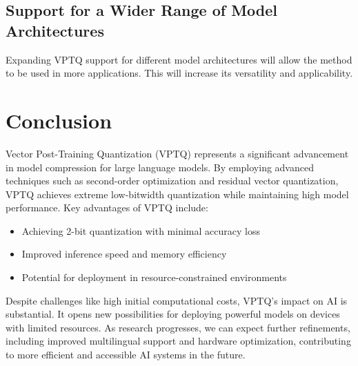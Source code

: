 \documentclass{article}
\begin{document}
\subsection{Support for a Wider Range of Model Architectures}
Expanding VPTQ support for different model architectures will allow the method to be used in more applications. This will increase its versatility and applicability.

\section{Conclusion}
Vector Post-Training Quantization (VPTQ) represents a significant advancement in model compression for large language models. By employing advanced techniques such as second-order optimization and residual vector quantization, VPTQ achieves extreme low-bitwidth quantization while maintaining high model performance.
Key advantages of VPTQ include:
\begin{itemize}
\item Achieving 2-bit quantization with minimal accuracy loss
\item Improved inference speed and memory efficiency
\item Potential for deployment in resource-constrained environments
\end{itemize}
Despite challenges like high initial computational costs, VPTQ's impact on AI is substantial. It opens new possibilities for deploying powerful models on devices with limited resources. As research progresses, we can expect further refinements, including improved multilingual support and hardware optimization, contributing to more efficient and accessible AI systems in the future.
\end{document}
